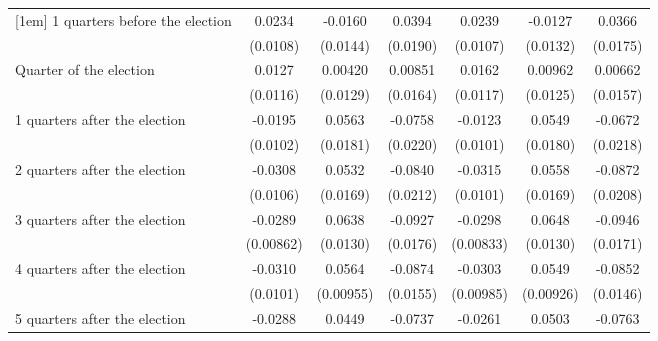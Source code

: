 \begin{table}[htbp]
\begin{tabular}{l*{6}{c}}
[1em]
 1 quarters before the election&      0.0234\sym{*}  &     -0.0160         &      0.0394\sym{*}  &      0.0239\sym{*}  &     -0.0127         &      0.0366\sym{*}  \\
                    &    (0.0108)         &    (0.0144)         &    (0.0190)         &    (0.0107)         &    (0.0132)         &    (0.0175)         \\
[1em]
Quarter of the election&      0.0127         &     0.00420         &     0.00851         &      0.0162         &     0.00962         &     0.00662         \\
                    &    (0.0116)         &    (0.0129)         &    (0.0164)         &    (0.0117)         &    (0.0125)         &    (0.0157)         \\
[1em]
 1 quarters after the election&     -0.0195         &      0.0563\sym{**} &     -0.0758\sym{***}&     -0.0123         &      0.0549\sym{**} &     -0.0672\sym{**} \\
                    &    (0.0102)         &    (0.0181)         &    (0.0220)         &    (0.0101)         &    (0.0180)         &    (0.0218)         \\
[1em]
 2 quarters after the election&     -0.0308\sym{**} &      0.0532\sym{**} &     -0.0840\sym{***}&     -0.0315\sym{**} &      0.0558\sym{***}&     -0.0872\sym{***}\\
                    &    (0.0106)         &    (0.0169)         &    (0.0212)         &    (0.0101)         &    (0.0169)         &    (0.0208)         \\
[1em]
 3 quarters after the election&     -0.0289\sym{***}&      0.0638\sym{***}&     -0.0927\sym{***}&     -0.0298\sym{***}&      0.0648\sym{***}&     -0.0946\sym{***}\\
                    &   (0.00862)         &    (0.0130)         &    (0.0176)         &   (0.00833)         &    (0.0130)         &    (0.0171)         \\
[1em]
 4 quarters after the election&     -0.0310\sym{**} &      0.0564\sym{***}&     -0.0874\sym{***}&     -0.0303\sym{**} &      0.0549\sym{***}&     -0.0852\sym{***}\\
                    &    (0.0101)         &   (0.00955)         &    (0.0155)         &   (0.00985)         &   (0.00926)         &    (0.0146)         \\
[1em]
 5 quarters after the election&     -0.0288\sym{**} &      0.0449\sym{**} &     -0.0737\sym{***}&     -0.0261\sym{*}  &      0.0503\sym{***}&     -0.0763\sym{***}\\

\end{tabular}
\end{table}
